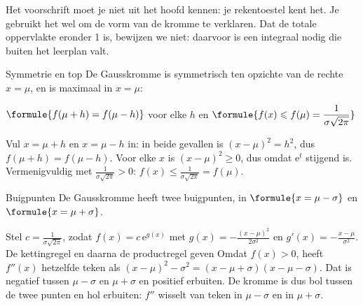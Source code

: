 Het voorschrift moet je niet uit het hoofd kennen: je rekentoestel kent het. Je gebruikt het wel om de vorm van de kromme te verklaren. Dat de totale oppervlakte eronder 1 is, bewijzen we niet: daarvoor is een integraal nodig die buiten het leerplan valt.

\begin{theorie}
\begin{stelling}{Symmetrie en top}
De Gausskromme is symmetrisch ten opzichte van de rechte $x = \mu$, en is maximaal in $x = \mu$:

\vspace{1mm}
\qquad $\formule{f(\mu + h) = f(\mu - h)}$ \quad voor elke $h$ \qquad en \qquad $\formule{f(x) \leqslant f(\mu) = \dfrac{1}{\sigma\sqrt{2\pi}}}$
\end{stelling}

\begin{bewijs}
Vul $x = \mu + h$ en $x = \mu - h$ in: in beide gevallen is $(x - \mu)^2 = h^2$, dus $f(\mu + h) = f(\mu - h)$. Voor elke $x$ is $(x - \mu)^2 \geqslant 0$, dus
omdat $\mathrm{e}^t$ stijgend is. Vermenigvuldig met $\frac{1}{\sigma\sqrt{2\pi}} > 0$: $f(x) \leqslant \frac{1}{\sigma\sqrt{2\pi}} = f(\mu)$.
\end{bewijs}

\begin{stelling}{Buigpunten}
De Gausskromme heeft twee buigpunten, in $\formule{x = \mu - \sigma}$ en $\formule{x = \mu + \sigma}$.
\end{stelling}

\begin{bewijs}
Stel $c = \frac{1}{\sigma\sqrt{2\pi}}$, zodat $f(x) = c\,\mathrm{e}^{g(x)}$ met $g(x) = -\frac{(x - \mu)^2}{2\sigma^2}$ en $g'(x) = -\frac{x - \mu}{\sigma^2}$. De kettingregel en daarna de productregel geven
Omdat $f(x) > 0$, heeft $f''(x)$ hetzelfde teken als $(x - \mu)^2 - \sigma^2 = (x - \mu + \sigma)(x - \mu - \sigma)$. Dat is negatief tussen $\mu - \sigma$ en $\mu + \sigma$ en positief erbuiten. De kromme is dus bol tussen de twee punten en hol erbuiten: $f''$ wisselt van teken in $\mu - \sigma$ en in $\mu + \sigma$.
\end{bewijs}
\end{theorie}

